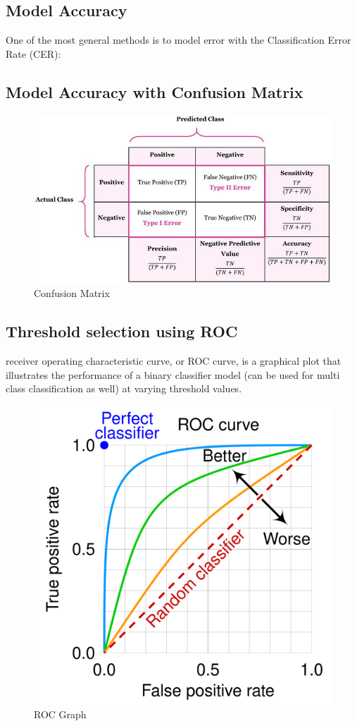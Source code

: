 \documentclass[../Main.tex]{subfiles}
\begin{document}
\subsection{Model Accuracy}
One of the most general methods is to model error with the Classification Error Rate (CER):

\subsection{Model Accuracy with Confusion Matrix}
\begin{figure}[H]
    \centering
    \includegraphics[width=0.75\linewidth]{Images/conf-matrix.jpg}
    \caption{Confusion Matrix}
\end{figure}

\subsection{Threshold selection using ROC}
receiver operating characteristic curve, or ROC curve,
is a graphical plot that illustrates the performance of a binary classifier model
(can be used for multi class classification as well) at varying threshold values.

\begin{figure}[H]
    \centering
    \includegraphics[width=0.5\linewidth]{Images/roc.png}
    \caption{ROC Graph}
\end{figure}
\end{document}
